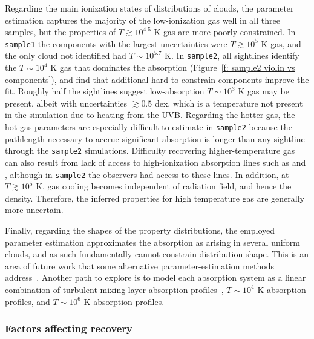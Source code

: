 \documentclass[fleqn,usenatbib]{mnras}
\begin{document}
Regarding the main ionization states of distributions of clouds,
the parameter estimation captures the majority of the low-ionization gas well in all three samples, but the properties of $T \gtrsim 10^{4.5}$ K gas are more poorly-constrained.
In \texttt{sample1} the components with the largest uncertainties were $T \gtrsim 10^5$ K gas,
and the only cloud not identified had $T \sim 10^{5.7}$ K.
In \texttt{sample2}, all sightlines identify the $T \sim 10^4$ K gas that dominates the absorption (Figure~\ref{f: sample2 violin vs components}),
and find that additional hard-to-constrain components improve the fit.
Roughly half the sightlines suggest low-absorption $T \sim 10^3$ K gas may be present, albeit with uncertainties $\gtrsim 0.5$ dex, which is a temperature not present in the simulation due to heating from the UVB.
Regarding the hotter gas, the hot gas parameters are especially difficult to estimate in \texttt{sample2} because the pathlength necessary to accrue significant absorption is longer than any sightline through the \texttt{sample2} simulations.
Difficulty recovering higher-temperature gas can also result from lack of access to high-ionization absorption lines such as  and ,
although in \texttt{sample2} the observers had access to these lines.
In addition, at $T \gtrsim 10^5$ K, gas cooling becomes independent of radiation field, and hence the density. 
Therefore, the inferred properties for high temperature gas are generally more uncertain.

Finally, regarding the shapes of the property distributions,
the employed parameter estimation approximates the absorption as arising in several uniform clouds,
and as such fundamentally cannot constrain distribution shape.
This is an area of future work that some alternative parameter-estimation methods address~\citep[such as fitting the underlying density distribution as a power law;][]{stern2016Universal}.
Another path to explore is to model each absorption system as a linear combination of turbulent-mixing-layer absorption profiles~\citep{tan2021Model}, $T \sim 10^4$ K absorption profiles, and $T \sim 10^6$ K absorption profiles. 

\subsubsection{Factors affecting recovery}
\label{s: discussion -- cloud structure -- factors}
\end{document}
